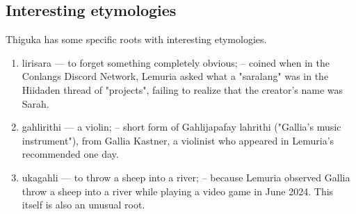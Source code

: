 \subsection{Interesting etymologies}
Thiguka has some specific roots with interesting etymologies.

\begin{enumerate}
    \item lirisara --- to forget something completely obvious; -- coined when in the Conlangs Discord Network, Lemuria asked what a "saralang" was in the Hiidaden thread of "projects", failing to realize that the creator's name was Sarah.
    \item gahlirithi --- a violin; -- short form of Gahlijapafay lahrithi ("Gallia's music instrument"), from Gallia Kastner, a violinist who appeared in Lemuria's recommended one day.
    \item ukagahli --- to throw a sheep into a river; -- because Lemuria observed Gallia throw a sheep into a river while playing a video game in June 2024. This itself is also an unusual root.
\end{enumerate}
